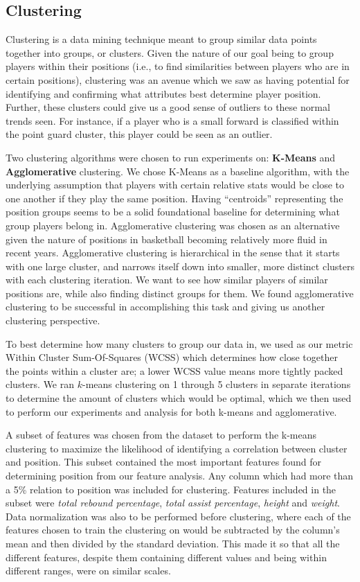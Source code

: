 \documentclass[./main.tex]{subfiles}
\begin{document}
\subsection{Clustering}\label{subsec:clustering}
Clustering is a data mining technique meant to group similar data points together into groups, or clusters. Given the nature of our goal being to group players within their positions (i.e., to find similarities between players who are in certain positions), clustering was an avenue which we saw as having potential for identifying and confirming what attributes best determine player position. Further, these clusters could give us a good sense of outliers to these normal trends seen. For instance, if a player who is a small forward is classified within the point guard cluster, this player could be seen as an outlier.

Two clustering algorithms were chosen to run experiments on: \textbf{K-Means} and \textbf{Agglomerative} clustering. We chose K-Means as a baseline algorithm, with the underlying assumption that players with certain relative stats would be close to one another if they play the same position. Having ``centroids'' representing the position groups seems to be a solid foundational baseline for determining what group players belong in. Agglomerative clustering was chosen as an alternative given the nature of positions in basketball becoming relatively more fluid in recent years. Agglomerative clustering is hierarchical in the sense that it starts with one large cluster, and narrows itself down into smaller, more distinct clusters with each clustering iteration. We want to see how similar players of similar positions are, while also finding distinct groups for them. We found agglomerative clustering to be successful in accomplishing this task and giving us another clustering perspective.

To best determine how many clusters to group our data in, we used as our metric Within Cluster Sum-Of-Squares (WCSS) which determines how close together the points within a cluster are; a lower WCSS value means more tightly packed clusters. We ran $k$-means clustering on 1 through 5 clusters in separate iterations to determine the amount of clusters which would be optimal, which we then used to perform our experiments and analysis for both k-means and agglomerative.

A subset of features was chosen from the dataset to perform the k-means clustering to maximize the likelihood of identifying a correlation between cluster and position. This subset contained the most important features found for determining position from our feature analysis. Any column which had more than a 5\% relation to position was included for clustering. Features included in the subset were \textit{total rebound percentage}, \textit{total assist percentage}, \textit{height} and \textit{weight}. Data normalization was also to be performed before clustering, where each of the features chosen to train the clustering on would be subtracted by the column's mean and then divided by the standard deviation. This made it so that all the different features, despite them containing different values and being within different ranges, were on similar scales.
\end{document}
